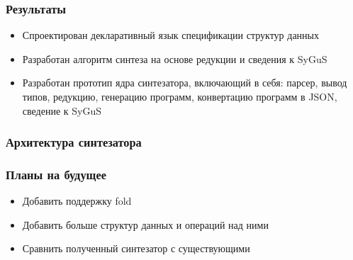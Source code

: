 \documentclass[14pt]{beamer}
\begin{document}
\begin{frame}
\frametitle{Результаты}
\begin{itemize}
    \item Спроектирован декларативный язык спецификации структур данных
    \item Разработан алгоритм синтеза на основе редукции и сведения к SyGuS
    \item Разработан прототип ядра синтезатора, включающий в себя: парсер, вывод типов, редукцию, генерацию программ, конвертацию программ в JSON, сведение к SyGuS
\end{itemize}
\end{frame}

\begin{frame}
\frametitle{Архитектура синтезатора}
\begin{center}
\end{center}
\end{frame}


\begin{frame}
\frametitle{Планы на будущее}
\begin{itemize}
    \item Добавить поддержку fold
    \item Добавить больше структур данных и операций над ними
    \item Сравнить полученный синтезатор с существующими
\end{itemize}
\end{frame}
\end{document}
